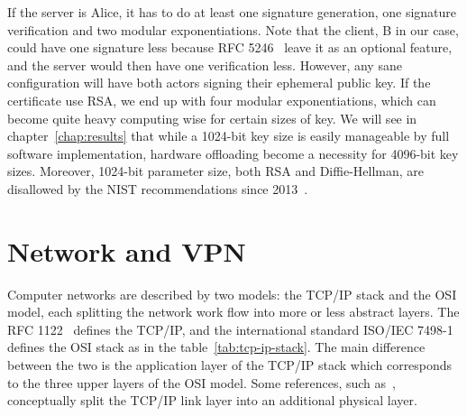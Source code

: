 If the server is Alice, it has to do at least one signature generation, one signature verification and two modular exponentiations.
Note that the client, B in our case, could have one signature less because RFC 5246~\cite{rfc5246} leave it as an optional feature, and the server would then have one verification less.
However, any sane configuration will have both actors signing their ephemeral public key.
If the certificate use RSA, we end up with four modular exponentiations, which can become quite heavy computing wise for certain sizes of key.
We will see in chapter~\ref{chap:results} that while a 1024-bit key size is easily manageable by full software implementation, hardware offloading become a necessity for 4096-bit key sizes.
Moreover, 1024-bit parameter size, both RSA and Diffie-Hellman, are disallowed by the NIST recommendations since 2013~\cite{nist-sp800-131A}.












\section{Network and VPN}\label{sec:theory-network}

Computer networks are described by two models: the TCP/IP stack and the OSI model, each splitting the network work flow into more or less abstract layers.
The RFC 1122~\cite{rfc1122} defines the TCP/IP, and the international standard ISO/IEC 7498-1~\cite{ISOIEC7498} defines the OSI stack as in the table~\ref{tab:tcp-ip-stack}.
The main difference between the two is the application layer of the TCP/IP stack which corresponds to the three upper layers of the OSI model.
Some references, such as~\citet{tanenbaum2011}, conceptually split the TCP/IP link layer into an additional physical layer.

